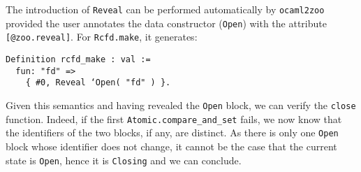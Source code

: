 The introduction of \texttt{Reveal} can be performed automatically by \texttt{ocaml2zoo} provided the user annotates the data constructor (\eg \texttt{Open}) with the attribute \texttt{[@zoo.reveal]}.
For \texttt{Rcfd.make}, it generates:

\begin{verbatim}
Definition rcfd_make : val :=
  fun: "fd" =>
    { #0, Reveal ‘Open( "fd" ) }.
\end{verbatim}

Given this semantics and having revealed the \texttt{Open} block, we can verify the \texttt{close} function.
Indeed, if the first \texttt{Atomic.compare_and_set} fails, we now know that the identifiers of the two blocks, if any, are distinct.
As there is only one \texttt{Open} block whose identifier does not change, it cannot be the case that the current state is \texttt{Open}, hence it is \texttt{Closing} and we can conclude.
